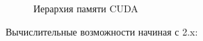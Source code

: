 \documentclass[a4paper,14pt,russian]{extreport}
\begin{document}
  \begin{figure}[h]
  \caption{Иерархия памяти CUDA}
  \label{ris:mem_hierarchy}
  \end{figure}
\par Вычислительные возможности начиная с 2.x:
\end{document}
